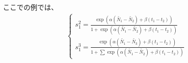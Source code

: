 \documentclass{jsarticle}
\begin{document}
ここでの例では、
\begin{align*}
	\begin{cases}
		s_1^2 = \frac{\exp(\alpha(\tilde{N_1} - \tilde{N_2}) + \beta(t_1 - t_2))}{1 + \exp(\alpha(\tilde{N_1} - \tilde{N_2}) + \beta(t_1 - t_2))}\\
		s_1^3 = \frac{\exp(\alpha(\tilde{N_1} - \tilde{N_3}) + \beta(t_1 - t_2))}{1 + \sum \exp(\alpha(\tilde{N_1} - \tilde{N_2}) + \beta(t_1 - t_2))}
	\end{cases}
\end{align*}
\end{document}
